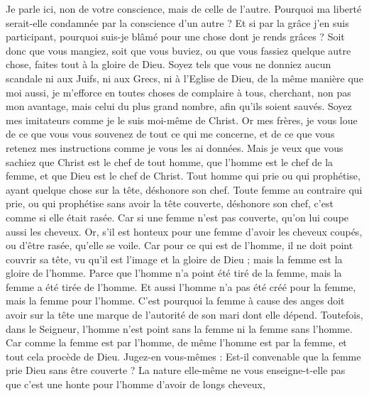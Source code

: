 \begin{multicols}{2}
Je parle ici, non de votre conscience, mais de celle de l'autre. Pourquoi ma liberté serait-elle condamnée par la conscience d'un autre ?
Et si par la grâce j'en suis participant, pourquoi suis-je blâmé pour une chose dont je rends grâces ?
Soit donc que vous mangiez, soit que vous buviez, ou que vous fassiez quelque autre chose, faites tout à la gloire de Dieu.
Soyez tels que vous ne donniez aucun scandale ni aux Juifs, ni aux Grecs, ni à l'Eglise de Dieu,
de la même manière que moi aussi, je m’efforce en toutes choses de complaire à tous, cherchant, non pas mon avantage, mais celui du plus grand nombre, afin qu’ils soient sauvés.
\VerseOne{}Soyez mes imitateurs comme je le suis moi-même de Christ.
Or mes frères, je vous loue de ce que vous vous souvenez de tout ce qui me concerne, et de ce que vous retenez mes instructions comme je vous les ai données.
Mais je veux que vous sachiez que Christ est le chef de tout homme, que l’homme est le chef de la femme, et que Dieu est le chef de Christ.
Tout homme qui prie ou qui prophétise, ayant quelque chose sur la tête, déshonore son chef.
Toute femme au contraire qui prie, ou qui prophétise sans avoir la tête couverte, déshonore son chef, c'est comme si elle était rasée.
Car si une femme n'est pas couverte, qu’on lui coupe aussi les cheveux. Or, s'il est honteux pour une femme d'avoir les cheveux coupés, ou d'être rasée, qu'elle se voile.
Car pour ce qui est de l'homme, il ne doit point couvrir sa tête, vu qu'il est l'image et la gloire de Dieu ; mais la femme est la gloire de l'homme.
Parce que l'homme n'a point été tiré de la femme, mais la femme a été tirée de l'homme.
Et aussi l'homme n'a pas été créé pour la femme, mais la femme pour l'homme.
C'est pourquoi la femme à cause des anges doit avoir sur la tête une marque de l’autorité de son mari dont elle dépend.
Toutefois, dans le Seigneur, l'homme n'est point sans la femme ni la femme sans l'homme.
Car comme la femme est par l'homme, de même l'homme est par la femme, et tout cela procède de Dieu.
Jugez-en vous-mêmes : Est-il convenable que la femme prie Dieu sans être couverte ?
La nature elle-même ne vous enseigne-t-elle pas que c’est une honte pour l'homme d’avoir de longs cheveux,

\end{multicols}

